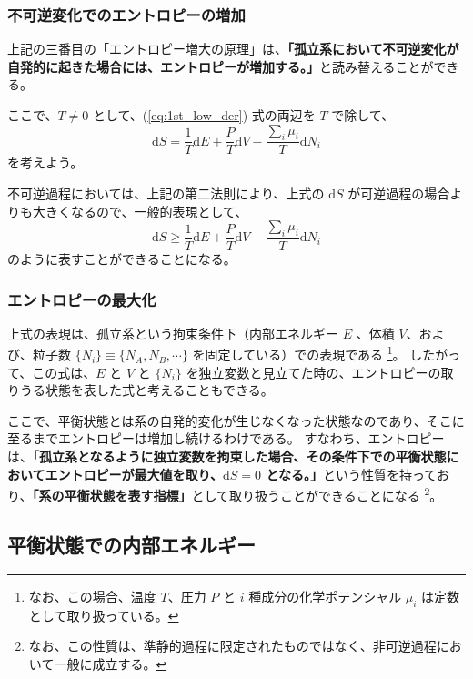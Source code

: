 \documentclass[uplatex,dvipdfmx,a4paper,11pt]{jsarticle}
\newcommand{\diff}{\mathrm d}
\begin{document}
\subsubsection{不可逆変化でのエントロピーの増加}

上記の三番目の「エントロピー増大の原理」は、{\bf「孤立系において不可逆変化が自発的に起きた場合には、エントロピーが増加する。」}と読み替えることができる。

ここで、$T \neq 0$ として、(\ref{eq:1st_low_der}) 式の両辺を $T$ で除して、
\begin{equation}
\diff S = \dfrac{1}{T} \diff E + \dfrac{P}{T} \diff V - \dfrac{\sum_i \mu_i}{T} \diff N_i
\label{eq:1st_low_mod}
\end{equation}
を考えよう。

不可逆過程においては、上記の第二法則により、上式の $\diff S$ が可逆過程の場合よりも大きくなるので、一般的表現として、
\begin{equation}
\diff S \geq \dfrac{1}{T} \diff E + \dfrac{P}{T} \diff V - \dfrac{\sum_i \mu_i}{T} \diff N_i
\label{eq:1st_low_gt}
\end{equation}
のように表すことができることになる。

\subsubsection{エントロピーの最大化}
上式の表現は、孤立系という拘束条件下（内部エネルギー $E$ 、体積 $V$、および、粒子数 $\{N_i \} \equiv \{ N_A, N_B, \cdots \}$ を固定している）での表現である
\footnote
{
なお、この場合、温度 $T$、圧力 $P$ と $i$ 種成分の化学ポテンシャル $\mu_i$ は定数として取り扱っている。
}。
したがって、この式は、$E$ と $V$ と $\{ N_i \}$ を独立変数と見立てた時の、エントロピーの取りうる状態を表した式と考えることもできる。

ここで、平衡状態とは系の自発的変化が生じなくなった状態なのであり、そこに至るまでエントロピーは増加し続けるわけである。
すなわち、エントロピーは、{\bf 「孤立系となるように独立変数を拘束した場合、その条件下での平衡状態においてエントロピーが最大値を取り、$\diff S=0$ となる。」}という性質を持っており、{\bf 「系の平衡状態を表す指標」}として取り扱うことができることになる
\footnote
{
なお、この性質は、準静的過程に限定されたものではなく、非可逆過程において一般に成立する。
}。

\subsection{平衡状態での内部エネルギー}
\end{document}

